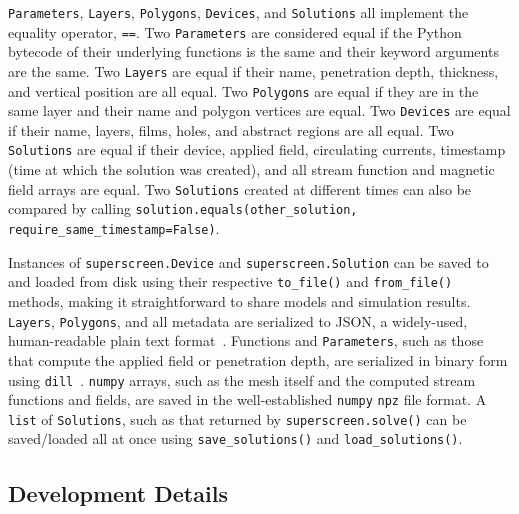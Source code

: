 \documentclass[preprint,12pt]{elsarticle}
\begin{document}
\texttt{Parameters}, \texttt{Layers}, \texttt{Polygons}, \texttt{Devices}, and \texttt{Solutions} all implement the equality operator, \texttt{==}. Two \texttt{Parameters} are considered equal if the Python bytecode of their underlying functions is the same and their keyword arguments are the same. Two \texttt{Layers} are equal if their name, penetration depth, thickness, and vertical position are all equal. Two \texttt{Polygons} are equal if they are in the same layer and their name and polygon vertices are equal. Two \texttt{Devices} are equal if their name, layers, films, holes, and abstract regions are all equal. Two \texttt{Solutions} are equal if their device, applied field, circulating currents, timestamp (time at which the solution was created), and all stream function and magnetic field arrays are equal. Two \texttt{Solutions} created at different times can also be compared by calling \texttt{solution.equals(other_solution, require_same_timestamp=False)}.

Instances of \texttt{superscreen.Device} and \texttt{superscreen.Solution} can be saved to and loaded from disk using their respective \texttt{to_file()} and \texttt{from_file()} methods, making it straightforward to share models and simulation results. \texttt{Layers}, \texttt{Polygons}, and all metadata are serialized to JSON, a widely-used, human-readable plain text format~\cite{JSON}. Functions and \texttt{Parameters}, such as those that compute the applied field or penetration depth, are serialized in binary form using \texttt{dill}~\cite{McKerns}. \texttt{numpy} arrays, such as the mesh itself and the computed stream functions and fields, are saved in the well-established \texttt{numpy} \texttt{npz} file format. A \texttt{list} of \texttt{Solutions}, such as that returned by \texttt{superscreen.solve()} can be saved/loaded all at once using \texttt{save_solutions()} and \texttt{load_solutions()}.

\subsection{Development Details}
\label{section:overview:development}
\end{document}
